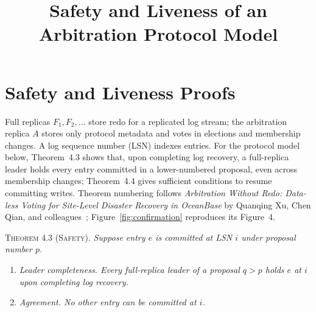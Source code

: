 \documentclass[sigconf,nonacm]{acmart}
\title{Safety and Liveness of an Arbitration Protocol Model}
\begin{document}
\maketitle
{}
\pagestyle{plain}
\thispagestyle{plain}
\raggedbottom
\appendix
\section{Safety and Liveness Proofs}

Full replicas \(F_1, F_2, \ldots\) store redo for a replicated log stream;
the arbitration replica \(A\) stores only protocol metadata and votes in
elections and membership changes. A log sequence number (LSN) indexes
entries. For the protocol model below, Theorem~4.3 shows that, upon
completing log recovery, a full-replica leader holds every entry
committed in a lower-numbered proposal, even across membership changes;
Theorem~4.4 gives sufficient conditions to resume committing writes.
Theorem numbering follows \emph{Arbitration Without Redo: Data-less
Voting for Site-Level Disaster Recovery in OceanBase} by Quanqing Xu,
Chen Qian, and colleagues~\cite{arbitration}; Figure~\ref{fig:confirmation}
reproduces its Figure~4.

\noindent\textsc{Theorem 4.3 (Safety).}
\emph{Suppose entry \(e\) is committed at LSN \(i\) under proposal
number \(p\).}
\begin{enumerate}
  \item[\emph{(a)}] \emph{Leader completeness. Every full-replica leader
    of a proposal \(q>p\) holds \(e\) at \(i\) upon completing log recovery.}
  \item[\emph{(b)}] \emph{Agreement. No other entry can be committed at \(i\).}
\end{enumerate}
\end{document}

